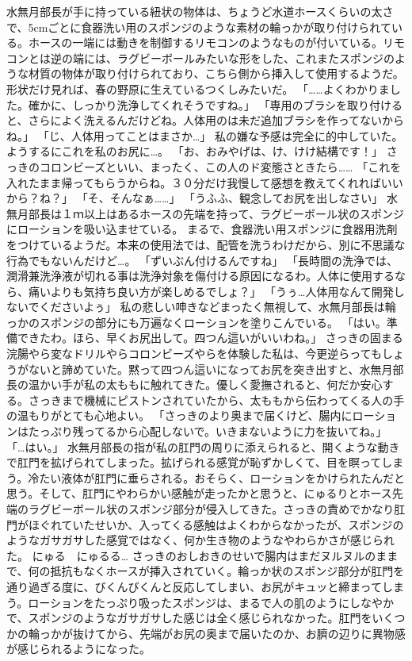 水無月部長が手に持っている紐状の物体は、ちょうど水道ホースくらいの太さで、5cmごとに食器洗い用のスポンジのような素材の輪っかが取り付けられている。ホースの一端には動きを制御するリモコンのようなものが付いている。リモコンとは逆の端には、ラグビーボールみたいな形をした、これまたスポンジのような材質の物体が取り付けられており、こちら側から挿入して使用するようだ。形状だけ見れば、春の野原に生えているつくしみたいだ。
「……よくわかりました。確かに、しっかり洗浄してくれそうですね。」
「専用のブラシを取り付けると、さらによく洗えるんだけどね。人体用のは未だ追加ブラシを作ってないからね。」
「じ、人体用ってことはまさか…」
私の嫌な予感は完全に的中していた。ようするにこれを私のお尻に…。
「お、おみやげは、け、けけ結構です！」
さっきのコロンビーズといい、まったく、この人のド変態さときたら……
「これを入れたまま帰ってもらうからね。３０分だけ我慢して感想を教えてくれればいいから？ね？」
「そ、そんなぁ……」
「うふふ、観念してお尻を出しなさい」
水無月部長は１ｍ以上はあるホースの先端を持って、ラグビーボール状のスポンジにローションを吸い込ませている。
まるで、食器洗い用スポンジに食器用洗剤をつけているようだ。本来の使用法では、配管を洗うわけだから、別に不思議な行為でもないんだけど…。
「ずいぶん付けるんですね」
「長時間の洗浄では、潤滑兼洗浄液が切れる事は洗浄対象を傷付ける原因になるわ。人体に使用するなら、痛いよりも気持ち良い方が楽しめるでしょ？」
「うぅ…人体用なんて開発しないでくださいよぅ」
私の悲しい呻きなどまったく無視して、水無月部長は輪っかのスポンジの部分にも万遍なくローションを塗りこんでいる。
「はい。準備できたわ。ほら、早くお尻出して。四つん這いがいいわね。」
さっきの固まる浣腸やら変なドリルやらコロンビーズやらを体験した私は、今更逆らってもしょうがないと諦めていた。黙って四つん這いになってお尻を突き出すと、水無月部長の温かい手が私の太ももに触れてきた。優しく愛撫されると、何だか安心する。さっきまで機械にピストンされていたから、太ももから伝わってくる人の手の温もりがとても心地よい。
「さっきのより奥まで届くけど、腸内にローションはたっぷり残ってるから心配しないで。いきまないように力を抜いてね。」
「…はい。」
水無月部長の指が私の肛門の周りに添えられると、開くような動きで肛門を拡げられてしまった。拡げられる感覚が恥ずかしくて、目を瞑ってしまう。冷たい液体が肛門に垂らされる。おそらく、ローションをかけられたんだと思う。そして、肛門にやわらかい感触が走ったかと思うと、にゅるりとホース先端のラグビーボール状のスポンジ部分が侵入してきた。さっきの責めでかなり肛門がほぐれていたせいか、入ってくる感触はよくわからなかったが、スポンジのようなガサガサした感覚ではなく、何か生き物のようなやわらかさが感じられた。
にゅる　にゅるる…
さっきのおしおきのせいで腸内はまだヌルヌルのままで、何の抵抗もなくホースが挿入されていく。輪っか状のスポンジ部分が肛門を通り過ぎる度に、びくんびくんと反応してしまい、お尻がキュッと締まってしまう。ローションをたっぷり吸ったスポンジは、まるで人の肌のようにしなやかで、スポンジのようなガサガサした感じは全く感じられなかった。肛門をいくつかの輪っかが抜けてから、先端がお尻の奥まで届いたのか、お臍の辺りに異物感が感じられるようになった。
